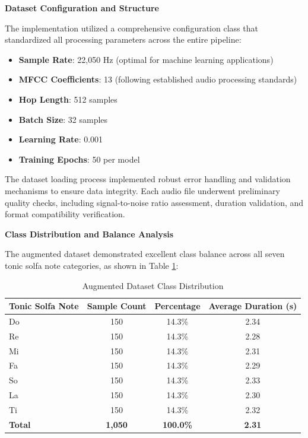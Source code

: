 \documentclass[12pt,a4paper]{article}
\begin{document}
\textbf{Dataset Configuration and Structure}

The implementation utilized a comprehensive configuration class that standardized all processing parameters across the entire pipeline:

\begin{itemize}
\item \textbf{Sample Rate}: 22,050 Hz (optimal for machine learning applications)
\item \textbf{MFCC Coefficients}: 13 (following established audio processing standards)
\item \textbf{Hop Length}: 512 samples
\item \textbf{Batch Size}: 32 samples
\item \textbf{Learning Rate}: 0.001
\item \textbf{Training Epochs}: 50 per model
\end{itemize}

The dataset loading process implemented robust error handling and validation mechanisms to ensure data integrity. Each audio file underwent preliminary quality checks, including signal-to-noise ratio assessment, duration validation, and format compatibility verification.

\textbf{Class Distribution and Balance Analysis}

The augmented dataset demonstrated excellent class balance across all seven tonic solfa note categories, as shown in Table \ref{tab:dataset_distribution}:

\begin{table}[H]
\centering
\caption{Augmented Dataset Class Distribution}
\label{tab:dataset_distribution}
\begin{tabular}{@{}lccc@{}}
\toprule
\textbf{Tonic Solfa Note} & \textbf{Sample Count} & \textbf{Percentage} & \textbf{Average Duration (s)} \\
\midrule
Do & 150 & 14.3\% & 2.34 \\
Re & 150 & 14.3\% & 2.28 \\
Mi & 150 & 14.3\% & 2.31 \\
Fa & 150 & 14.3\% & 2.29 \\
So & 150 & 14.3\% & 2.33 \\
La & 150 & 14.3\% & 2.30 \\
Ti & 150 & 14.3\% & 2.32 \\
\midrule
\textbf{Total} & \textbf{1,050} & \textbf{100.0\%} & \textbf{2.31} \\
\bottomrule
\end{tabular}
\end{table}
\end{document}

